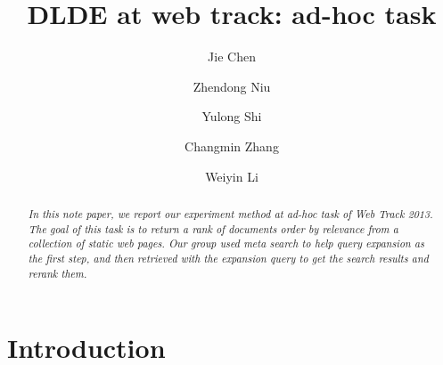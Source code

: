 \documentclass[runningheads,a4paper]{llncs}
\begin{document}
\mainmatter  %

\title{DLDE at web track: ad-hoc task}


%
%
\author{Jie Chen \and Zhendong Niu \and Yulong Shi \and Changmin Zhang \and Weiyin Li }

%

\institute{\\
\mailsa\\
\mailsb\\}

%
%

\maketitle

\begin{abstract}
\emph{In this note paper, we report our experiment method at ad-hoc task of Web Track 2013. The goal of this task is to return a rank of documents order by relevance from a collection of static web pages. Our group used meta search to help query expansion as the first step, and then retrieved with the expansion query to get the search results and rerank them. }
\end{abstract}

\section{Introduction}
\end{document}

